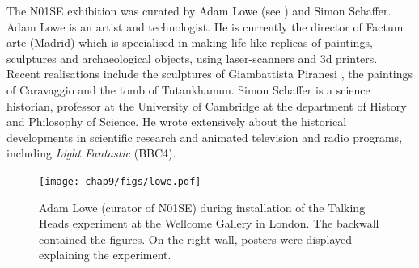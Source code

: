 The N01SE exhibition was curated by Adam Lowe (see ) and Simon Schaffer. 
Adam Lowe is an artist and technologist. He is currently the director of Factum arte (Madrid) which is specialised 
in making life-like replicas of paintings, sculptures and archaeological objects, using laser-scanners and 3d printers. 
Recent realisations include the sculptures of Giambattista Piranesi \citep{Lowe:2010}, the 
paintings of Caravaggio and the tomb of Tutankhamun. 
Simon Schaffer is a science historian, professor at the University of Cambridge at the department of History and Philosophy 
of Science. He wrote extensively about the historical developments in scientific research \citep{Schaffer:2011}
and animated television and radio programs, including {\itshape Light Fantastic} (BBC4). 
\begin{figure}[htbp]
  \centerline{\texttt{[image: chap9/figs/lowe.pdf]}}
\caption{\label{fig:lowe}Adam Lowe (curator of N01SE) during installation of the Talking Heads experiment at the Wellcome Gallery in London. 
The backwall contained the figures. On the right wall, posters were displayed explaining the experiment.}
\end{figure}


